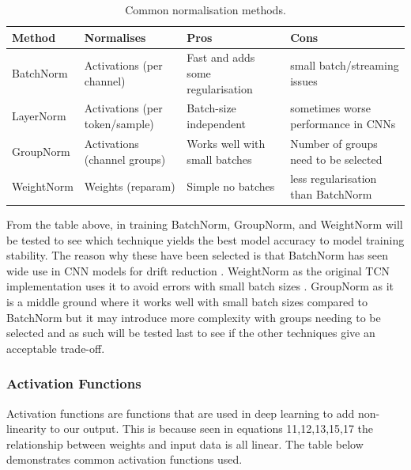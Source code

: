 \begin{table}[!htbp]
\centering
\small
\begin{tabular}{p{2.0cm} p{3.0cm} p{5.0cm} p{5.0cm}}
\hline
\textbf{Method} & \textbf{Normalises}   & \textbf{Pros} & \textbf{Cons} \\
\hline
BatchNorm & Activations (per channel) &
 Fast and adds some regularisation &  small batch/streaming issues \\
LayerNorm & Activations (per token/sample)  &
 Batch-size independent & sometimes worse performance in CNNs \\
GroupNorm & Activations (channel groups) &
 Works well with small batches & Number of groups need to be selected \\
WeightNorm & Weights (reparam) &
 Simple no batches & less regularisation than BatchNorm \\
\hline
\end{tabular}
\caption{Common normalisation methods.}
\label{tab:normalisation_methods}
\end{table}

\FloatBarrier

From the table above, in training BatchNorm, GroupNorm, and WeightNorm will be 
tested to see which technique yields the best model accuracy to model training 
stability. The reason why these have been selected is that BatchNorm has seen wide
use in CNN models for drift reduction \cite{brossard_2020_denoising}\cite{chen_2018_improving}. WeightNorm
as the original TCN implementation uses it to avoid errors with small batch sizes \cite{bai_2018_an}.
GroupNorm as it is a middle ground where it works well with small batch sizes compared
to BatchNorm but it may introduce more complexity with groups needing to be selected and
as such will be tested last to see if the other techniques give an acceptable trade-off.

\subsubsection{Activation Functions}
Activation functions are functions that are used in deep learning to add non-linearity
to our output. This is because seen in equations 11,12,13,15,17 the relationship between
weights and input data is all linear. The table below demonstrates common activation functions
used.

